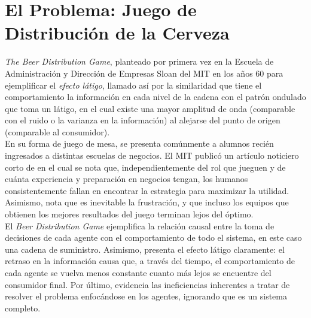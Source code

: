 \chapter{El Problema: Juego de Distribuci\'on de la Cerveza}






\textit{The Beer Distribution Game}, planteado por primera vez en la Escuela de Administraci\'on y Direcci\'on de Empresas Sloan del MIT en los años 60 para ejemplificar el \textit{efecto l\'atigo}, llamado as\'i por la similaridad que tiene el comportamiento la informaci\'on en cada nivel de la cadena con el patr\'on ondulado que toma un l\'atigo, en el cual existe una mayor amplitud de onda (comparable con el ruido o la varianza en la informaci\'on) al alejarse del punto de origen (comparable al consumidor). \\

En su forma de juego de mesa, se presenta com\'unmente a alumnos reci\'en ingresados a distintas escuelas de negocios. El MIT public\'o un art\'iculo noticiero corto de \citet{Dizikes} en el cual se nota que, independientemente del rol que jueguen y de cu\'anta experiencia y preparaci\'on en negocios tengan, los humanos consistentemente fallan en encontrar la estrategia para maximizar la utilidad. Asimismo, nota que es inevitable la frustraci\'on, y que incluso los equipos que obtienen los mejores resultados del juego terminan lejos del \'optimo. \\

El \textit{Beer Distribution Game} ejemplifica la relaci\'on causal entre la toma de decisiones de cada agente con el comportamiento de todo el sistema, en este caso una cadena de suministro. Asimismo, presenta el efecto l\'atigo claramente: el retraso en la informaci\'on  causa que, a trav\'es del tiempo, el comportamiento de cada agente se vuelva menos constante cuanto m\'as lejos se encuentre del consumidor final. Por \'ultimo, evidencia las ineficiencias inherentes a tratar de resolver el problema enfoc\'andose en los agentes, ignorando que es un sistema completo. 


